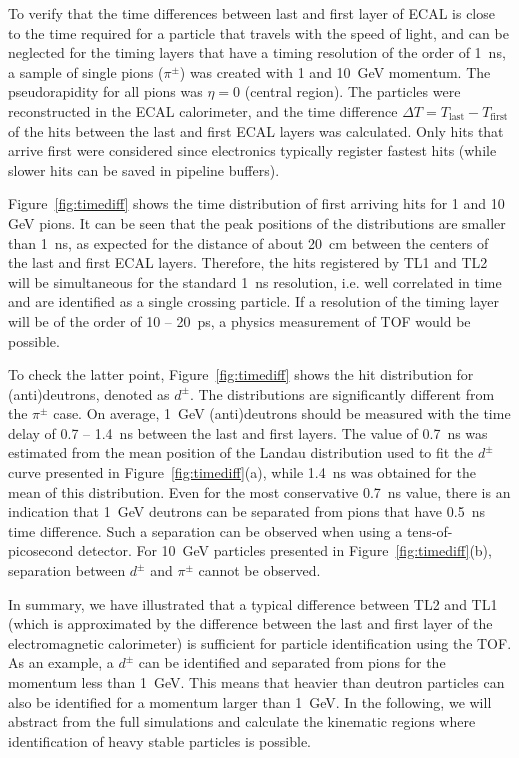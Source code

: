 \documentclass[final,1p,11pt]{elsarticle}
\begin{document}
To verify that the time differences between last and first layer of ECAL is close to the time
required for a particle that travels with the speed of light, and can be neglected for the timing layers that
have a timing resolution of the order of 1~ns, a sample of single pions ($\pi^\pm$) was created with 1 and 10~GeV momentum. The
pseudorapidity for all pions was $\eta=0$ (central region). 
The particles were reconstructed in the ECAL calorimeter,
and the time difference $\Delta T= T_{\mathrm{last}}-T_{\mathrm{first}}$ of the hits between the last and first ECAL layers was calculated.
Only hits that arrive first were considered since electronics typically register fastest hits (while slower hits can be saved in pipeline buffers).

Figure~\ref{fig:timediff} shows the time distribution of first arriving hits 
for 1 and 10 GeV pions. It can be seen that the peak positions of the distributions are smaller
than 1~ns, as expected for the distance of about 20~cm between  the centers of the last and first ECAL layers.
Therefore, the hits registered by TL1 and TL2 will be simultaneous for the
standard 1~ns resolution, i.e. well correlated in time and are identified as a single crossing particle.
If a resolution of the timing layer will be of the order of 10 -- 20~ps, a physics measurement of TOF would be possible.

To check the latter point, 
Figure~\ref{fig:timediff} shows the hit distribution for (anti)deutrons, denoted as $d^{\pm}$. 
The distributions are significantly different from the $\pi^{\pm}$ case. On average, 1~GeV
(anti)deutrons should be measured with the time delay of 0.7 -- 1.4~ns between the last and first layers.
The value of 0.7~ns was estimated from the mean position of the Landau distribution used to fit the $d^{\pm}$ 
curve presented in Figure~\ref{fig:timediff}(a),
while 1.4~ns was obtained for the mean of this distribution. Even for the most conservative 0.7~ns value, there is an indication that 1~GeV
deutrons can be separated from pions that have 0.5~ns time difference. Such a separation can be observed when using a tens-of-picosecond detector.
For 10~GeV particles presented in Figure~\ref{fig:timediff}(b), separation between $d^{\pm}$ and $\pi^{\pm}$ cannot be observed.

In summary, we have illustrated that a typical difference between TL2 and TL1 (which is approximated by the difference
between the last and first layer of the electromagnetic calorimeter) is sufficient for particle identification using the TOF.
As an example, a $d^{\pm}$ can be identified and separated from pions for the momentum less than 1~GeV.
This means that  heavier than deutron particles can also be identified for a momentum larger than 1~GeV.
In the following, we will abstract from the full simulations and calculate the kinematic regions  where identification of heavy stable 
particles is possible.
 
\end{document}
